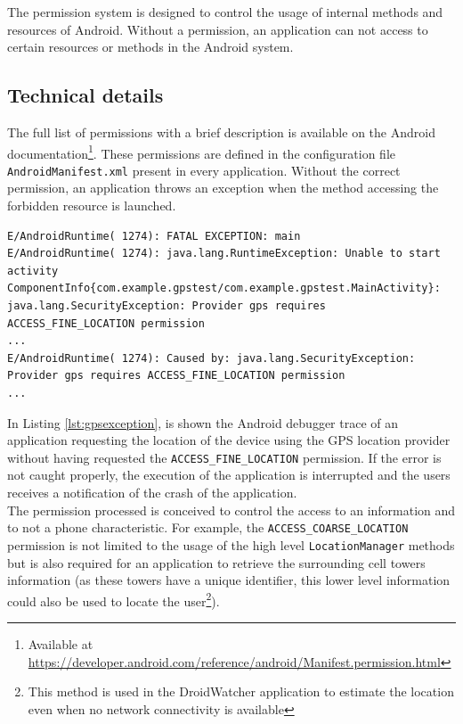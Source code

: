 The permission system is designed to control the usage of internal methods and resources of Android.
Without a permission, an application can not access to certain resources or methods in the Android system.

\subsection{Technical details}
The full list of permissions with a brief description is available on the Android documentation\footnote{Available at \url{https://developer.android.com/reference/android/Manifest.permission.html}}.
These permissions are defined in the configuration file \texttt{AndroidManifest.xml} present in every application.
Without the correct permission, an application throws an exception when the method accessing the forbidden resource is launched.

\begin{lstlisting}[breaklines,caption={Example of permission violation log},label={lst:gpsexception},numbers=none]
E/AndroidRuntime( 1274): FATAL EXCEPTION: main
E/AndroidRuntime( 1274): java.lang.RuntimeException: Unable to start activity ComponentInfo{com.example.gpstest/com.example.gpstest.MainActivity}: java.lang.SecurityException: Provider gps requires ACCESS_FINE_LOCATION permission
...
E/AndroidRuntime( 1274): Caused by: java.lang.SecurityException: Provider gps requires ACCESS_FINE_LOCATION permission
...
\end{lstlisting}

In Listing \ref{lst:gpsexception}, is shown the Android debugger trace of an application requesting the location of the device using the GPS location provider without having requested the \texttt{ACCESS\_FINE\_LOCATION} permission.
If the error is not caught properly, the execution of the application is interrupted and the users receives a notification of the crash of the application.\\

The permission processed is conceived to control the access to an information and to not a phone characteristic.
For example, the \texttt{ACCESS\_COARSE\_LOCATION} permission is not limited to the usage of the high level \texttt{LocationManager} methods but is also required for an application to retrieve the surrounding cell towers information (as these towers have a unique identifier, this lower level information could also be used to locate the user\footnote{This method is used in the DroidWatcher application to estimate the location even when no network connectivity is available}).

